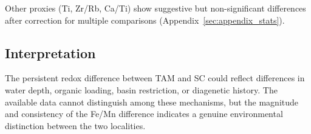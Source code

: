 Other proxies (Ti, Zr/Rb, Ca/Ti) show suggestive but non-significant differences after correction for multiple comparisons (Appendix~\ref{sec:appendix_stats}).

\subsection{Interpretation}
\label{sec:interpretation}

The persistent redox difference between TAM and SC could reflect differences in water depth, organic loading, basin restriction, or diagenetic history. The available data cannot distinguish among these mechanisms, but the magnitude and consistency of the Fe/Mn difference indicates a genuine environmental distinction between the two localities.

